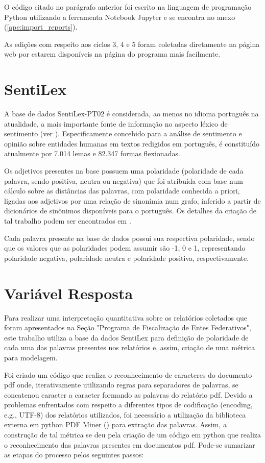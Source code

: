 O código citado no parágrafo anterior foi escrito na linguagem de programação Python utilizando a ferramenta Notebook Jupyter e se encontra no anexo (\ref{ape:import_reports}).

As edições com respeito aos ciclos 3, 4 e 5 foram coletadas diretamente na página web por estarem disponíveis na página do programa mais facilmente.

\section{SentiLex}
\label{sec:sentilex}

A base de dados SentiLex-PT02 é considerada, ao menos no idioma português na atualidade, a mais importante fonte de informação no aspecto léxico de sentimento (ver \citet{BeckerTumitan2014}). Especificamente concebido para a análise de sentimento e opinião sobre entidades humanas em textos redigidos em português, é constituído atualmente por 7.014 lemas e 82.347 formas flexionadas.

Os adjetivos presentes na base possuem uma polaridade (polaridade de cada palavra, sendo positiva, neutra ou negativa) que foi atribuída com base num cálculo sobre as distâncias das palavras, com polaridade conhecida a priori, ligadas aos adjetivos por uma relação de sinonímia num grafo, inferido a partir de dicionários de sinônimos disponíveis para o português. Os detalhes da criação de tal trabalho podem ser encontrados em \citet{Silva2012}.

Cada palavra presente na base de dados possui sua respectiva polaridade, sendo que os valores que as polaridades podem assumir são -1, 0 e 1, representando polaridade negativa, polaridade neutra e polaridade positiva, respectivamente.

\section{Variável Resposta}
\label{sec:variavel_resposta}

Para realizar uma interpretação quantitativa sobre os relatórios coletados que foram apresentados na Seção "Programa de Fiscalização de Entes Federativos", este trabalho utiliza a base da dados SentiLex para definição de polaridade de cada uma das palavras presentes nos relatórios e, assim, criação de uma métrica para modelagem.

Foi criado um código que realiza o reconhecimento de caracteres do documento pdf onde, iterativamente utilizando regras para separadores de palavras, se concatenou caracter a caracter formando as palavras do relatório pdf. Devido a problemas enfrentados com respeito a diferentes tipos de codificação (encoding, e.g., UTF-8) dos relatórios utilizados, foi necessário a utilização da biblioteca externa em python PDF Miner (\citet{PDFMiner}) para extração das palavras. Assim, a construção de tal métrica se deu pela criação de um código em python que realiza o reconhecimento das palavras presentes em documentos pdf. Pode-se sumarizar as etapas do processo pelos seguintes passos:

